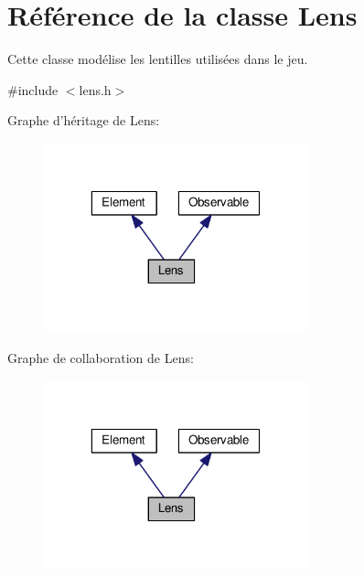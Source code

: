 \hypertarget{classLens}{\section{Référence de la classe Lens}
\label{classLens}
}


Cette classe modélise les lentilles utilisées dans le jeu.  




{\ttfamily \#include $<$lens.\+h$>$}



Graphe d'héritage de Lens\+:\nopagebreak
\begin{figure}[H]
\begin{center}
\leavevmode
\includegraphics[width=217pt]{d4/def/classLens__inherit__graph}
\end{center}
\end{figure}


Graphe de collaboration de Lens\+:\nopagebreak
\begin{figure}[H]
\begin{center}
\leavevmode
\includegraphics[width=217pt]{d8/df0/classLens__coll__graph}
\end{center}
\end{figure}
